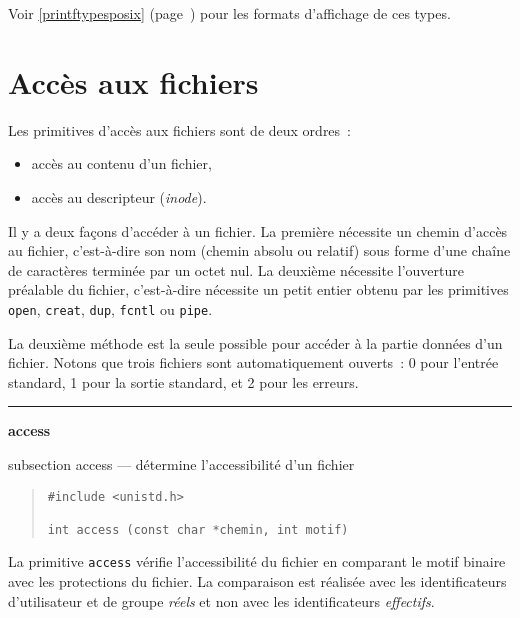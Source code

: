 \documentclass [twoside] {report}
\newcommand {\primitive} [1]
    {
	\phantomsection
	{\large \textbf {#1}}
	\addcontentsline {toc} {subsection} {#1}
    }
\newcommand {\separation}
    {
	\vspace {5mm}
	\nopagebreak
	\hrule
    }
\begin{document}
Voir \ref {printftypesposix} (page~\pageref {printftypesposix}) pour
les formats d'affichage de ces types.




\section {Accès aux fichiers}


Les primitives d'accès aux fichiers sont de deux
ordres~:
\begin {itemize}
    \item accès au contenu d'un fichier,
    \item accès au descripteur (\textit {inode}).
\end {itemize}

Il y a deux façons d'accéder à un fichier. La première nécessite un
chemin d'accès au fichier, c'est-à-dire son nom (chemin absolu ou
relatif) sous forme d'une chaîne
de caractères terminée par un octet nul.  La deuxième nécessite
l'ouverture préalable du fichier, c'est-à-dire nécessite un petit
entier obtenu par les primitives \texttt {open}, \texttt {creat}, \texttt {dup},
\texttt {fcntl} ou \texttt {pipe}.

La deuxième méthode est la seule possible pour
accéder à la partie données d'un fichier. Notons
que trois fichiers sont automatiquement ouverts~:
0 pour l'entrée standard, 1 pour la sortie
standard, et 2 pour les erreurs.





\separation
\primitive {access} --- détermine l'accessibilité d'un fichier

\begin {quote}
\begin {verbatim}
#include <unistd.h>

int access (const char *chemin, int motif)
\end{verbatim}
\end {quote}

La primitive \texttt {access} vérifie l'accessibilité
du fichier en comparant le motif binaire avec les
protections du fichier. La comparaison est
réalisée avec les identificateurs d'utilisateur et
de groupe \textit {réels} et non avec les identificateurs
\textit {effectifs}.
\end{document}
